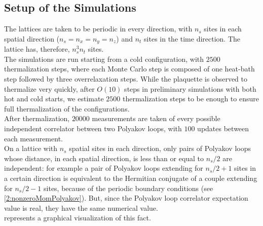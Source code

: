 \subsection{Setup of the Simulations}
The lattices are taken to be periodic in every direction, with $n_s$ sites in each spatial direction ($n_s=n_x=n_y=n_z$) and $n_t$ sites in the time direction.
The lattice has, therefore, $n_s^3n_t$ sites.\\
The simulations are run starting from a cold configuration, with $2500$ thermalization steps, where each Monte Carlo step is composed of one heat-bath step followed by three overrelaxation steps.
While the plaquette is observed to thermalize very quickly, after $O(10)$ steps in preliminary simulations with both hot and cold starts, we estimate $2500$ thermalization steps to be enough to ensure full thermalization of the configurations.\\
After thermalization, $20000$ measurements are taken of every possible independent correlator between two Polyakov loops, with $100$ updates between each measurement.\\
On a lattice with $n_s$ spatial sites in each direction, only pairs of Polyakov loops whose distance, in each spatial direction, is less than or equal to $n_s/2$ are independent: for example a pair of Polyakov loops extending for $n_s/2+1$ sites in a certain direction is equivalent to the Hermitian conjugate of a couple extending for $n_s/2-1$ sites, because of the periodic boundary conditions (see \eqref{2:nonzeroMomPolyakov}).
But, since the Polyakov loop correlator expectation value is real, they have the same numerical value.\\
 represents a graphical visualization of this fact.
